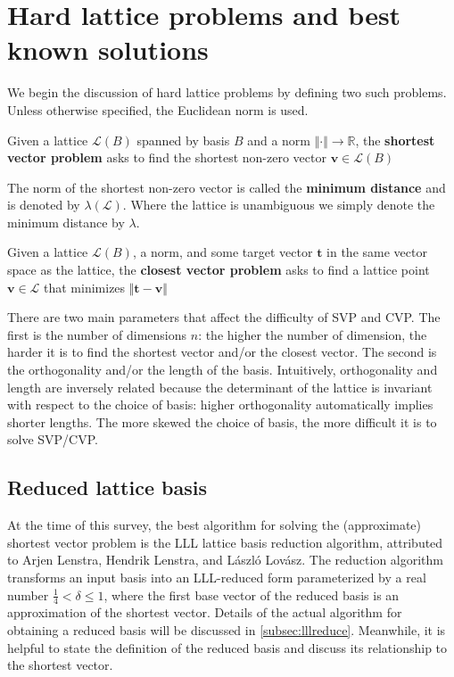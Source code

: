 \section{Hard lattice problems and best known solutions}
We begin the discussion of hard lattice problems by defining two such problems. Unless otherwise specified, the Euclidean norm is used.

\begin{definition}
    Given a lattice $\mathcal{L}(B)$ spanned by basis $B$ and a norm $\Vert \cdot \Vert \rightarrow \mathbb{R}$, the \textbf{shortest vector problem} asks to find the shortest non-zero vector $\mathbf{v} \in \mathcal{L}(B)$
\end{definition}

The norm of the shortest non-zero vector is called the \textbf{minimum distance} and is denoted by $\lambda(\mathcal{L})$. Where the lattice is unambiguous we simply denote the minimum distance by $\lambda$.

\begin{definition}
    Given a lattice $\mathcal{L}(B)$, a norm, and some target vector $\mathbf{t}$ in the same vector space as the lattice, the \textbf{closest vector problem} asks to find a lattice point $\mathbf{v} \in \mathcal{L}$ that minimizes $\Vert \mathbf{t} - \mathbf{v}\Vert$
\end{definition}

There are two main parameters that affect the difficulty of SVP and CVP. The first is the number of dimensions $n$: the higher the number of dimension, the harder it is to find the shortest vector and/or the closest vector. The second is the orthogonality and/or the length of the basis. Intuitively, orthogonality and length are inversely related because the determinant of the lattice is invariant with respect to the choice of basis: higher orthogonality automatically implies shorter lengths. The more skewed the choice of basis, the more difficult it is to solve SVP/CVP.

\subsection{Reduced lattice basis}
At the time of this survey, the best algorithm for solving the (approximate) shortest vector problem is the LLL lattice basis reduction algorithm\cite{lenstra1982factoring}, attributed to Arjen Lenstra, Hendrik Lenstra, and László Lovász. The reduction algorithm transforms an input basis into an LLL-reduced form parameterized by a real number $\frac{1}{4} < \delta \leq 1$, where the first base vector of the reduced basis is an approximation of the shortest vector. Details of the actual algorithm for obtaining a reduced basis will be discussed in \ref{subsec:lllreduce}. Meanwhile, it is helpful to state the definition of the reduced basis and discuss its relationship to the shortest vector.

